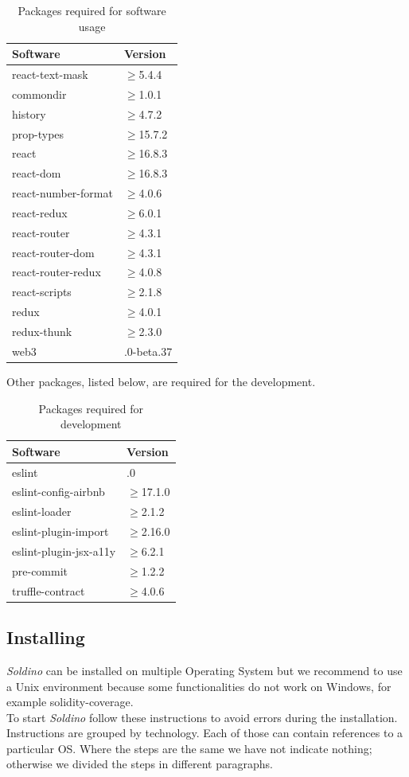 \renewcommand{\arraystretch}{1.5}
\begin{longtable}{ 
		>{\centering}p{} 
		>{\centering}p{}
	}
	\caption{Packages required for software usage}\\
	\rowcolorhead
	\textbf{\color{white}Software} & 
	\textbf{\color{white}Version}
	\tabularnewline  
	\endhead	
	


	react-text-mask & $\geq$5.4.4
	\tabularnewline
	commondir &$\geq$1.0.1
	\tabularnewline
	history &$\geq$4.7.2
	\tabularnewline
	prop-types &$\geq$15.7.2\tabularnewline
	react &$\geq$16.8.3\tabularnewline
	react-dom &$\geq$16.8.3\tabularnewline
	react-number-format &$\geq$4.0.6\tabularnewline
	react-redux &$\geq$6.0.1\tabularnewline
	react-router &$\geq$4.3.1\tabularnewline
	react-router-dom &$\geq$4.3.1\tabularnewline
	react-router-redux &$\geq$4.0.8\tabularnewline
	react-scripts &$\geq$2.1.8\tabularnewline
	redux &$\geq$4.0.1\tabularnewline
	redux-thunk &$\geq$2.3.0\tabularnewline
	web3 & 1.0.0-beta.37\tabularnewline
	
\end{longtable}

Other packages, listed below, are required for the development.
\renewcommand{\arraystretch}{1.5}
\begin{longtable}{ 
		>{\centering}p{} 
		>{\centering}p{}
	}
	\caption{Packages required for development}\\
	\rowcolorhead
	\textbf{\color{white}Software} & 
	\textbf{\color{white}Version}
	\tabularnewline  
	\endhead	
	
	eslint & 5.12.0\tabularnewline
	eslint-config-airbnb &$\geq$17.1.0\tabularnewline
	eslint-loader & $\geq$2.1.2\tabularnewline
	eslint-plugin-import & $\geq$2.16.0\tabularnewline
	eslint-plugin-jsx-a11y & $\geq$6.2.1\tabularnewline
	pre-commit & $\geq$1.2.2\tabularnewline
	truffle-contract & $\geq$4.0.6\tabularnewline
	
\end{longtable}

\subsection{Installing}
\textit{Soldino} can be installed on multiple Operating System but we recommend to use a 
Unix environment because some functionalities do not work on Windows, for example solidity-coverage.\\
To start \textit{Soldino} follow these instructions to avoid errors during the installation. Instructions are grouped by technology. Each of those can contain references to a particular OS. Where the steps are the same we have not indicate nothing; otherwise we divided the steps in different paragraphs.
